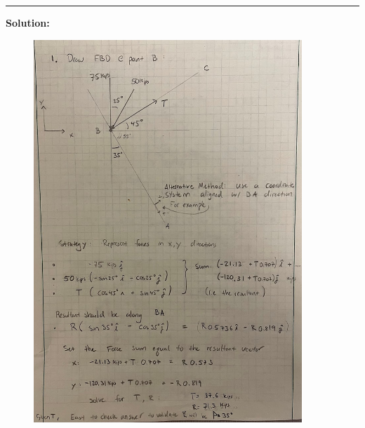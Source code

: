 \vspace{.5cm}
\rule{\textwidth}{.4pt}
\vspace{.5cm}
\textbf{Solution:}
\begin{figure}[ht!]
  \centering
  \includegraphics[width=0.9\textwidth,
	           height=0.4\textheight,
		   keepaspectratio]{soln.png}
\end{figure}

